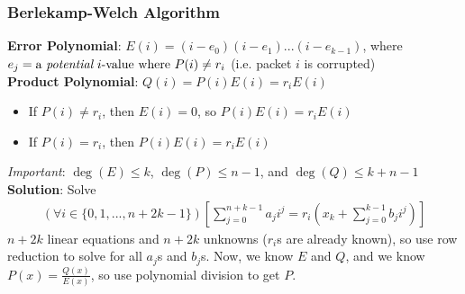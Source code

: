 \documentclass{beamer}
\begin{document}
\begin{frame}
    \frametitle{Berlekamp-Welch Algorithm}
    {\bf Error Polynomial}: $E(i)=(i-e_0)(i-e_1)...(i-e_{k-1})$, where $e_j=\text{a {\it potential} $i$-value where }P(i)\neq r_{i}$ (i.e. packet $i$ is corrupted)\\
    {\bf Product Polynomial}: $Q(i)=P(i)E(i)=r_iE(i)$
    \begin{itemize}
        \item If $P(i)\neq r_i$, then $E(i)=0$, so $P(i)E(i)=r_iE(i)$
        \item If $P(i)=r_i$, then $P(i)E(i)=r_iE(i)$
    \end{itemize}
    {\it Important}: $\deg(E)\leq k$, $\deg(P)\leq n-1$, and $\deg(Q)\leq k+n-1$\\
    {\bf Solution}: Solve
    \begin{gather*}
    (\forall i\in\{0,1,...,n+2k-1\})\left[\sum_{j=0}^{n+k-1}a_ji^j=r_i\left(x_k+\sum_{j=0}^{k-1}b_ji^j\right)\right]
    \end{gather*}
    $n+2k$ linear equations and $n+2k$ unknowns ($r_i$s are already known), so use row reduction to solve for all $a_j$s and $b_j$s. Now, we know $E$ and $Q$, and we know $P(x)=\frac{Q(x)}{E(x)}$, so use polynomial division to get $P$.
\end{frame}
\end{document}
